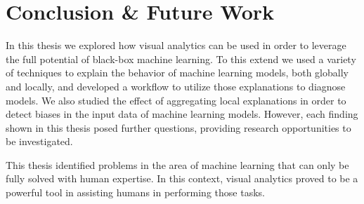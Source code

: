\chapter{Conclusion \& Future Work}
\label{chap:future_work}

In this thesis we explored how visual analytics can be used in order to leverage the full potential of black-box machine learning.
To this extend we used a variety of techniques to explain the behavior of machine learning models, both globally and locally, and developed a workflow to utilize those explanations to diagnose models.
We also studied the effect of aggregating local explanations in order to detect biases in the input data of machine learning models.
However, each finding shown in this thesis posed further questions, providing research opportunities to be investigated.

This thesis identified problems in the area of machine learning that can only be fully solved with human expertise.
In this context, visual analytics proved to be a powerful tool in assisting humans in performing those tasks.
